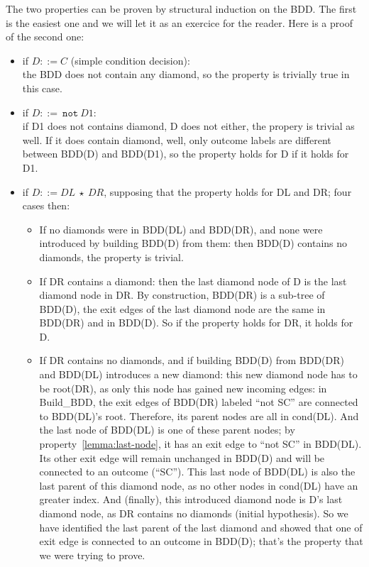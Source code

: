 \documentclass[a4paper,12pt,twoside]{article}
\newcommand{\anysc}{\star}
\newcommand{\adanot}{\texttt{not}}
\begin{document}
The two properties can be proven by structural induction on the BDD.
The first is the easiest one and we will let it as an exercice for the
reader. Here is a proof of the second one:

\begin{itemize}
\item if $D ::= C$ (simple condition decision):\\
  the BDD does not contain any diamond, so the property is trivially true
  in this case.

\item if $D ::=\ \adanot{} \ D1$:\\
  if D1 does not contains diamond, D does not either, the propery is trivial
  as well. If it does contain diamond, well, only outcome labels are different
  between BDD(D) and BDD(D1), so the property holds for D if it holds for D1.

\item if $D ::= DL \ \anysc{} \ DR$, supposing that the property holds
  for DL and DR; four cases then:

  \begin{itemize}
  \item If no diamonds were in BDD(DL) and BDD(DR), and none were introduced
    by building BDD(D) from them: then BDD(D) contains no diamonds, the
    property is trivial.

  \item If DR contains a diamond: then the last diamond node of D is
    the last diamond node in DR. By construction, BDD(DR) is a
    sub-tree of BDD(D), the exit edges of the last diamond node are
    the same in BDD(DR) and in BDD(D). So if the property holds for
    DR, it holds for D.

  \item If DR contains no diamonds, and if building BDD(D) from
    BDD(DR) and BDD(DL) introduces a new diamond: this new diamond
    node has to be root(DR), as only this node has gained new incoming
    edges: in Build\_BDD, the exit edges of BDD(DR) labeled ``not SC''
    are connected to BDD(DL)'s root. Therefore, its parent nodes are
    all in cond(DL). And the last node of BDD(DL) is one of these
    parent nodes; by property~\ref{lemma:last-node}, it has an exit
    edge to ``not SC'' in BDD(DL). Its other exit edge will remain
    unchanged in BDD(D) and will be connected to an outcome
    (``SC''). This last node of BDD(DL) is also the last parent of
    this diamond node, as no other nodes in cond(DL) have an greater
    index. And (finally), this introduced diamond node is D's last
    diamond node, as DR contains no diamonds (initial hypothesis). So
    we have identified the last parent of the last diamond and showed
    that one of exit edge is connected to an outcome in BDD(D); that's
    the property that we were trying to prove.


\end{itemize}
\end{itemize}
\end{document}
